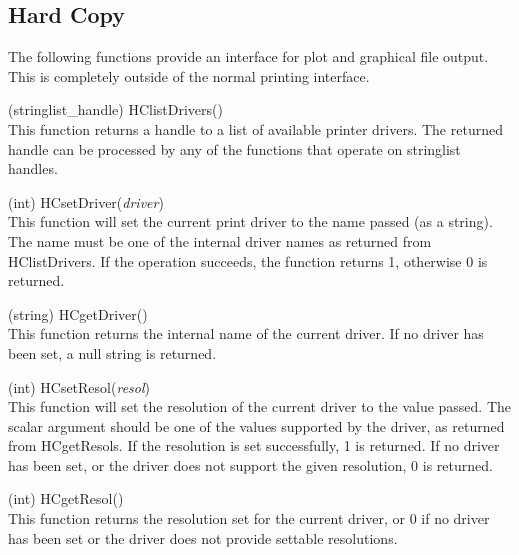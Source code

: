 \subsection{Hard Copy}

The following functions provide an interface for plot and graphical
file output.  This is completely outside of the normal printing
interface.

\begin{description}
\item{(stringlist\_handle) \vt HClistDrivers()}\\
This function returns a handle to a list of available printer drivers. 
The returned handle can be processed by any of the functions that
operate on stringlist handles.

\item{(int) \vt HCsetDriver({\it driver\/})}\\
This function will set the current print driver to the name passed (as
a string).  The name must be one of the internal driver names as
returned from {\vt HClistDrivers}.  If the operation succeeds, the
function returns 1, otherwise 0 is returned.

\item{(string) \vt HCgetDriver()}\\
This function returns the internal name of the current driver.  If no
driver has been set, a null string is returned.

\item{(int) \vt HCsetResol({\it resol\/})}\\
This function will set the resolution of the current driver to the
value passed.  The scalar argument should be one of the values
supported by the driver, as returned from {\vt HCgetResols}.  If the
resolution is set successfully, 1 is returned.  If no driver has been
set, or the driver does not support the given resolution, 0 is
returned.

\item{(int) \vt HCgetResol()}\\
This function returns the resolution set for the current driver, or 0
if no driver has been set or the driver does not provide settable
resolutions.


\end{description}
